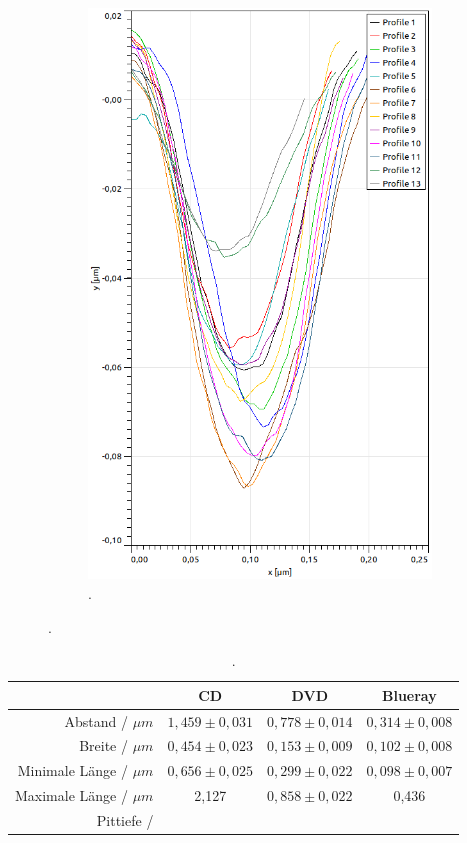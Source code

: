 \begin{figure}[H]
\begin{subfigure}[t]{0.3\textwidth}
	\includegraphics[width=\textwidth]{AFM_auswertung/bluray_tiefe_grafik.png}
	\caption{.}
	\label{abb:}
	\end{subfigure}
\caption{.}
\label{abb:pit_tiefe}
\end{figure}


\begin{table}
	\centering
	\caption{.}
\begin{tabular}{|r|ccc|}
	\hline
	{} & {CD} & {DVD} & {Blueray} \\
	\hline
	Abstand / $\mu m$ & $1,459 \pm 0,031$ & $0,778 \pm 0,014$ & $0,314 \pm 0,008$ \\
	Breite	/ $\mu m$ &	$0,454 \pm 0,023$ & $0,153 \pm 0,009$ & $0,102 \pm 0,008$ \\
	Minimale Länge / $\mu m$ & $0,656 \pm 0,025$ & $0,299 \pm 0,022$ & $0,098 \pm 0,007$ \\
	Maximale Länge / $\mu m$ & 2,127 & $0,858 \pm 0,022$ & 0,436 \\
	Pittiefe /  &  &  &  \\
	\hline
\end{tabular}
\label{tab:auf2}
\end{table}


